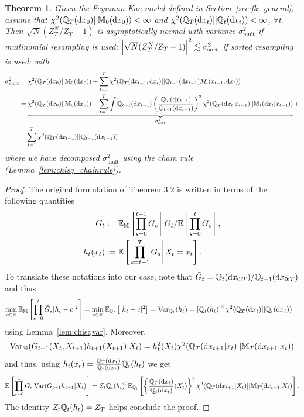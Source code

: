 \documentclass{article}
\theoremstyle{plain}
\newtheorem{theorem}{Theorem}[section]
\theoremstyle{definition}
\theoremstyle{remark}
\begin{document}
\newcommand{\sigmasqmult}{\sigma^2_{\mathrm{mult}}}
\newcommand{\sigmasqsort}{\sigma^2_{\mathrm{sort}}}
\newcommand{\lcfirstt}{\chisquared{\Q_T(\dd x_0)}{\M_0(\dd x_0)}}
\begin{theorem}
	\label{thm:webber_restated}
	Given the Feynman-Kac model defined in Section~\ref{sec:fk_general}, assume that $\chi^2(\mathbb{Q}_T(\dd x_0)||\mathbb M_0(\dd x_0)) < \infty$ and $\chi^2(\mathbb{Q}_T(\dd x_t)||\mathbb{Q}_t(\dd x_t)) < \infty$, $\forall t$. Then $\sqrt N(Z_T^N/Z_T-1)$ is asymptotically normal with variance $\sigmasqmult$ if multinomial resampling is used; $\abs{\sqrt N (Z_T^N/Z_T-1)}^2 \lesssim \sigmasqsort$ if sorted resampling \citep{gerber2019negative} is used; with
	\begin{equation*}
		\begin{split}
			\sigmasqmult &= \lcfirstt + \sum_{t=1}^T \chisquared{\Q_T(\dd x_{t-1}, \dd x_t)}{\Q_{t-1}(\dd x_{t-1}) M_t(x_{t-1}, \dd x_t)} \\
			&= \underbrace{\lcfirstt + \sum_{t=1}^T \int \Q_{t-1}(\dd x_{t-1}) \pr{\frac{\Q_T(\dd x_{t-1})}{\Q_{t-1}(\dd x_{t-1})}}^2 \chisquared{\Q_T(\dd x_t|x_{t-1})}{\M_t(\dd x_t|x_{t-1})}}_{\sigmasqsort} +\\
			&+ \sum_{t=1}^T \chisquared{\Q_T(\dd x_{t-1})}{\Q_{t-1}(\dd x_{t-1})}
		\end{split}
	\end{equation*}
	where we have decomposed $\sigmasqmult$ using the chain rule (Lemma~\ref{lem:chisq_chainrule}).
\end{theorem}
\begin{proof}
	The original formulation of Theorem 3.2 \citep{webber2019unifying} is written in terms of the following quantities
	\begin{align*}
		\tilde G_t & := \mathbb{E}_\mathbb M\left[ \prod_{s=0}^{t-1} G_s \right] G_t/\mathbb{E}\left[ \prod_{s=0}^t G_s \right], \\
		h_t(x_t)   & := \mathbb{E}\left[ \left. {\prod_{s=t+1}^T G_s} \right \vert {X_t=x_t} \right].
	\end{align*}
	To translate these notations into our case, note that $\tilde G_t = \mathbb{Q}_t(\dd x_{0:T})/\mathbb{Q}_{t-1}(\dd x_{0:T})$
	and thus
	\begin{equation*}
		\begin{split}
			\min_{c\in \mathbb R} \mathbb{E}_\mathbb M\left[ \prod_{s=0}^t \tilde G_s|h_t-c|^2 \right] &= \min_{c\in \mathbb R} \mathbb{E}_{\mathbb{Q}_t}\left[ |h_t-c|^2 \right] = \operatorname{Var}_{\mathbb{Q}_t}(h_t) = \left[ \mathbb{Q}_t(h_t) \right]^2 \chi^2(\mathbb{Q}_T(\dd x_t)||\mathbb{Q}_t(\dd x_t))
		\end{split}
	\end{equation*}
	using Lemma~\ref{lem:chisqvar}.
	Moreover,
	\begin{equation*}
		\operatorname{Var}_\mathbb M(G_{t+1}(X_t, X_{t+1})h_{t+1}(X_{t+1})|X_t) = h_t^2(X_t) \chi^2(\mathbb{Q}_T(\dd x_{t+1}|x_t)||\mathbb M_T(\dd x_{t+1}|x_t))
	\end{equation*}
	and thus, using $h_t(x_t) = \frac{\mathbb{Q}_T(\dd x_t)}{\mathbb{Q}_t(\dd x_t)} \mathbb{Q}_t(h_t)$ we get
	\begin{equation*}
		\mathbb{E}\left[ \prod_{s=0}^t G_s \operatorname{Var}(G_{t+1}h_{t+1}|X_t) \right] = Z_t \mathbb{Q}_t(h_t)^2 \mathbb{E}_{\mathbb{Q}_t}\left[ \left\{ \frac{\mathbb{Q}_T(\dd x_t)}{\mathbb{Q}_t(\dd x_t)}(X_t) \right\}^2 \chi^2(\mathbb{Q}_T(\dd x_{t+1}|X_t)||\mathbb M_T(\dd x_{t+1}|X_t) \right].
	\end{equation*}
	The identity $Z_t \mathbb{Q}_t(h_t) = Z_T$ helps conclude the proof.
\end{proof}
\end{document}
